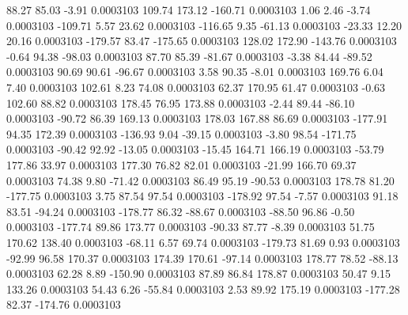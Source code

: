       88.27       85.03       -3.91     0.0003103
      109.74      173.12     -160.71     0.0003103
        1.06        2.46       -3.74     0.0003103
     -109.71        5.57       23.62     0.0003103
     -116.65        9.35      -61.13     0.0003103
      -23.33       12.20       20.16     0.0003103
     -179.57       83.47     -175.65     0.0003103
      128.02      172.90     -143.76     0.0003103
       -0.64       94.38      -98.03     0.0003103
       87.70       85.39      -81.67     0.0003103
       -3.38       84.44      -89.52     0.0003103
       90.69       90.61      -96.67     0.0003103
        3.58       90.35       -8.01     0.0003103
      169.76        6.04        7.40     0.0003103
      102.61        8.23       74.08     0.0003103
       62.37      170.95       61.47     0.0003103
       -0.63      102.60       88.82     0.0003103
      178.45       76.95      173.88     0.0003103
       -2.44       89.44      -86.10     0.0003103
      -90.72       86.39      169.13     0.0003103
      178.03      167.88       86.69     0.0003103
     -177.91       94.35      172.39     0.0003103
     -136.93        9.04      -39.15     0.0003103
       -3.80       98.54     -171.75     0.0003103
      -90.42       92.92      -13.05     0.0003103
      -15.45      164.71      166.19     0.0003103
      -53.79      177.86       33.97     0.0003103
      177.30       76.82       82.01     0.0003103
      -21.99      166.70       69.37     0.0003103
       74.38        9.80      -71.42     0.0003103
       86.49       95.19      -90.53     0.0003103
      178.78       81.20     -177.75     0.0003103
        3.75       87.54       97.54     0.0003103
     -178.92       97.54       -7.57     0.0003103
       91.18       83.51      -94.24     0.0003103
     -178.77       86.32      -88.67     0.0003103
      -88.50       96.86       -0.50     0.0003103
     -177.74       89.86      173.77     0.0003103
      -90.33       87.77       -8.39     0.0003103
       51.75      170.62      138.40     0.0003103
      -68.11        6.57       69.74     0.0003103
     -179.73       81.69        0.93     0.0003103
      -92.99       96.58      170.37     0.0003103
      174.39      170.61      -97.14     0.0003103
      178.77       78.52      -88.13     0.0003103
       62.28        8.89     -150.90     0.0003103
       87.89       86.84      178.87     0.0003103
       50.47        9.15      133.26     0.0003103
       54.43        6.26      -55.84     0.0003103
        2.53       89.92      175.19     0.0003103
     -177.28       82.37     -174.76     0.0003103
